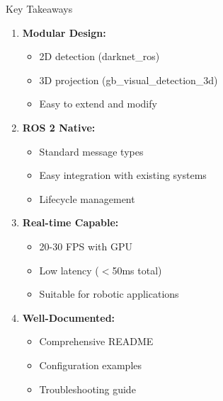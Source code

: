 \documentclass[aspectratio=169]{beamer}
\begin{document}
\begin{frame}{Key Takeaways}
\begin{enumerate}
    \item \textbf{Modular Design:}
    \begin{itemize}
        \item 2D detection (darknet\_ros)
        \item 3D projection (gb\_visual\_detection\_3d)
        \item Easy to extend and modify
    \end{itemize}

    \item \textbf{ROS 2 Native:}
    \begin{itemize}
        \item Standard message types
        \item Easy integration with existing systems
        \item Lifecycle management
    \end{itemize}

    \item \textbf{Real-time Capable:}
    \begin{itemize}
        \item 20-30 FPS with GPU
        \item Low latency ($<$50ms total)
        \item Suitable for robotic applications
    \end{itemize}

    \item \textbf{Well-Documented:}
    \begin{itemize}
        \item Comprehensive README
        \item Configuration examples
        \item Troubleshooting guide
    \end{itemize}
\end{enumerate}
\end{frame}
\end{document}
